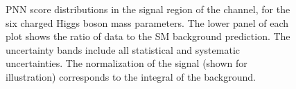 \begin{figure}
		  \caption{\label{fig:taujets_SR_PNNscores_body} PNN score distributions in the
		signal region of the \taujets channel, for the six charged Higgs boson mass parameters.
		The lower panel of each plot shows the ratio of data to the SM background prediction. The uncertainty bands include all statistical and systematic uncertainties. 
		The normalization of the signal (shown for illustration) corresponds to the integral of the background.}
		\end{figure}

